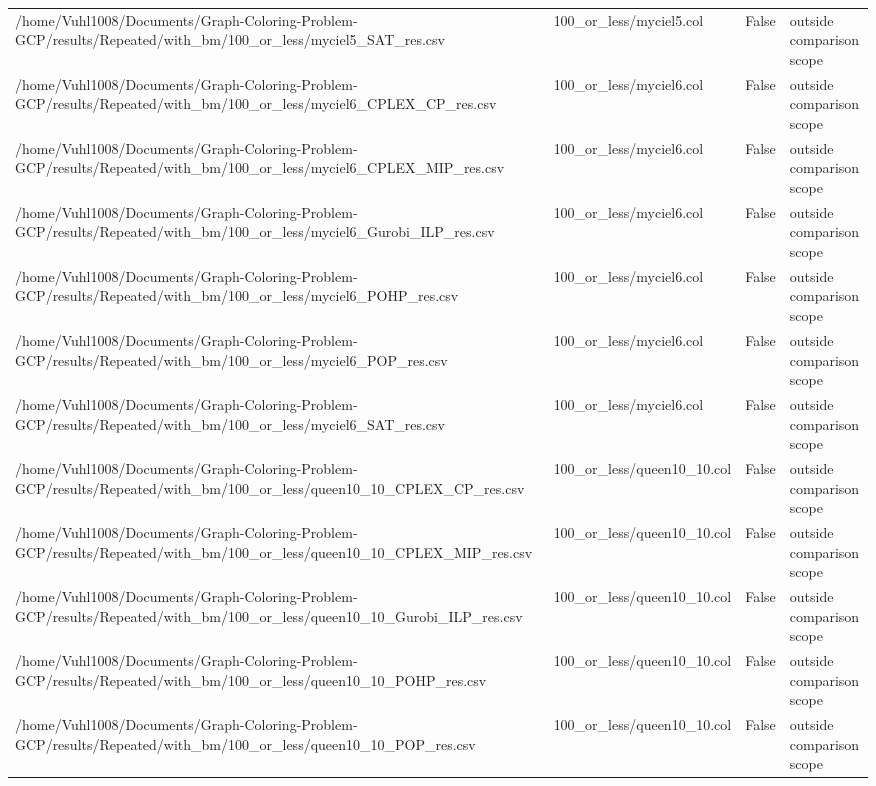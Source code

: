 \begin{table}[htbp]
\begin{tabular}{llll}
/home/Vuhl1008/Documents/Graph-Coloring-Problem-GCP/results/Repeated/with\_bm/100\_or\_less/myciel5\_SAT\_res.csv & 100\_or\_less/myciel5.col & False & outside comparison scope \\
/home/Vuhl1008/Documents/Graph-Coloring-Problem-GCP/results/Repeated/with\_bm/100\_or\_less/myciel6\_CPLEX\_CP\_res.csv & 100\_or\_less/myciel6.col & False & outside comparison scope \\
/home/Vuhl1008/Documents/Graph-Coloring-Problem-GCP/results/Repeated/with\_bm/100\_or\_less/myciel6\_CPLEX\_MIP\_res.csv & 100\_or\_less/myciel6.col & False & outside comparison scope \\
/home/Vuhl1008/Documents/Graph-Coloring-Problem-GCP/results/Repeated/with\_bm/100\_or\_less/myciel6\_Gurobi\_ILP\_res.csv & 100\_or\_less/myciel6.col & False & outside comparison scope \\
/home/Vuhl1008/Documents/Graph-Coloring-Problem-GCP/results/Repeated/with\_bm/100\_or\_less/myciel6\_POHP\_res.csv & 100\_or\_less/myciel6.col & False & outside comparison scope \\
/home/Vuhl1008/Documents/Graph-Coloring-Problem-GCP/results/Repeated/with\_bm/100\_or\_less/myciel6\_POP\_res.csv & 100\_or\_less/myciel6.col & False & outside comparison scope \\
/home/Vuhl1008/Documents/Graph-Coloring-Problem-GCP/results/Repeated/with\_bm/100\_or\_less/myciel6\_SAT\_res.csv & 100\_or\_less/myciel6.col & False & outside comparison scope \\
/home/Vuhl1008/Documents/Graph-Coloring-Problem-GCP/results/Repeated/with\_bm/100\_or\_less/queen10\_10\_CPLEX\_CP\_res.csv & 100\_or\_less/queen10\_10.col & False & outside comparison scope \\
/home/Vuhl1008/Documents/Graph-Coloring-Problem-GCP/results/Repeated/with\_bm/100\_or\_less/queen10\_10\_CPLEX\_MIP\_res.csv & 100\_or\_less/queen10\_10.col & False & outside comparison scope \\
/home/Vuhl1008/Documents/Graph-Coloring-Problem-GCP/results/Repeated/with\_bm/100\_or\_less/queen10\_10\_Gurobi\_ILP\_res.csv & 100\_or\_less/queen10\_10.col & False & outside comparison scope \\
/home/Vuhl1008/Documents/Graph-Coloring-Problem-GCP/results/Repeated/with\_bm/100\_or\_less/queen10\_10\_POHP\_res.csv & 100\_or\_less/queen10\_10.col & False & outside comparison scope \\
/home/Vuhl1008/Documents/Graph-Coloring-Problem-GCP/results/Repeated/with\_bm/100\_or\_less/queen10\_10\_POP\_res.csv & 100\_or\_less/queen10\_10.col & False & outside comparison scope \\

\end{tabular}
\end{table}
